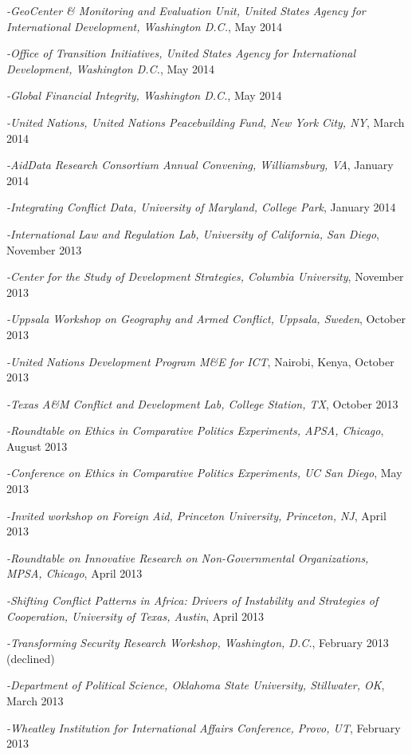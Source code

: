 \documentclass[10pt]{article}
\begin{document}
\begin{etaremune}
\item\textit{-GeoCenter \& Monitoring and Evaluation Unit, United States Agency for International Development, Washington D.C.}, May 2014
\item\textit{-Office of Transition Initiatives, United States Agency for International Development, Washington D.C.}, May 2014
\item\textit{-Global Financial Integrity, Washington D.C.}, May 2014
\item\textit{-United Nations, United Nations Peacebuilding Fund, New York City, NY}, March 2014
\item\textit{-AidData Research Consortium Annual Convening, Williamsburg, VA}, January 2014
\item\textit{-Integrating Conflict Data, University of Maryland, College Park}, January 2014
\item\textit{-International Law and Regulation Lab, University of California, San Diego}, November 2013
\item\textit{-Center for the Study of Development Strategies, Columbia University}, November 2013
\item\textit{-Uppsala Workshop on Geography and Armed Conflict, Uppsala, Sweden}, October 2013
\item\textit{-United Nations Development Program M\&E for ICT}, Nairobi, Kenya, October 2013
\item\textit{-Texas A\&M Conflict and Development Lab, College Station, TX}, October 2013
\item\textit{-Roundtable on Ethics in Comparative Politics Experiments, APSA, Chicago}, August 2013
\item\textit{-Conference on Ethics in Comparative Politics Experiments, UC San Diego}, May 2013
\item\textit{-Invited workshop on Foreign Aid, Princeton University, Princeton, NJ}, April 2013
\item\textit{-Roundtable on Innovative Research on Non-Governmental Organizations, MPSA, Chicago}, April 2013
\item\textit{-Shifting Conflict Patterns in Africa: Drivers of Instability and Strategies of Cooperation, University of Texas, Austin}, April 2013
\item\textit{-Transforming Security Research Workshop, Washington, D.C.}, February 2013 (declined)
\item\textit{-Department of Political Science, Oklahoma State University, Stillwater, OK}, March 2013
\item\textit{-Wheatley Institution for International Affairs Conference, Provo, UT}, February 2013

\end{etaremune}
\end{document}
